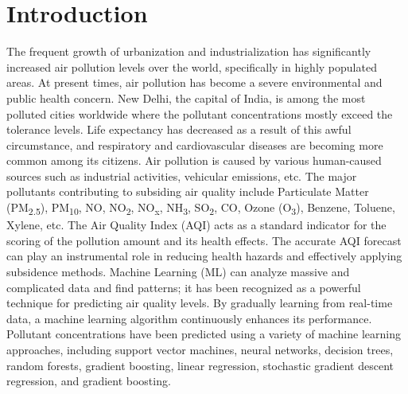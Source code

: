 \documentclass[conference]{IEEEtran}
\begin{document}
\section{Introduction}
The frequent growth of urbanization and industrialization has significantly increased air pollution levels over the world, specifically in highly populated areas. At present times, air pollution has become a severe environmental and public health concern. New Delhi, the capital of India, is among the most polluted cities worldwide where the pollutant concentrations mostly exceed the tolerance levels. Life expectancy has decreased as a result of this awful circumstance, and respiratory and cardiovascular diseases are becoming more common among its citizens. Air pollution is caused by various human-caused sources such as industrial activities, vehicular emissions, etc. The major pollutants contributing to subsiding air quality include Particulate Matter (PM\textsubscript{2.5}), PM\textsubscript{10}, NO, NO\textsubscript{2}, NO\textsubscript{x}, NH\textsubscript{3}, SO\textsubscript{2}, CO, Ozone (O\textsubscript{3}), Benzene, Toluene, Xylene, etc. The Air Quality Index (AQI) acts as a standard indicator for the scoring of the pollution amount and its health effects. The accurate AQI forecast can play an instrumental role in reducing health hazards and effectively applying subsidence methods. Machine Learning (ML) can analyze massive and complicated data and find patterns; it has been recognized as a powerful technique for predicting air quality levels. By gradually learning from real-time data, a machine learning algorithm continuously enhances its performance. Pollutant concentrations have been predicted using a variety of machine learning approaches, including support vector machines, neural networks, decision trees, random forests, gradient boosting, linear regression, stochastic gradient descent regression, and gradient boosting.
\end{document}
